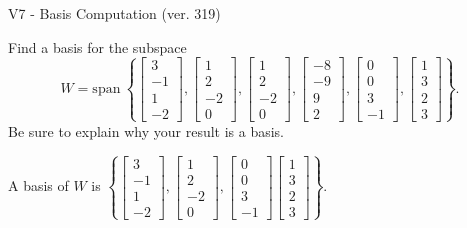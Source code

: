 \begin{exercise}
  \begin{exerciseTitle}V7 - Basis Computation (ver. 319)\end{exerciseTitle}
  \begin{exerciseStatement}
    Find a basis for the subspace 
\[W=\mathrm{span}\ \left\{\left[\begin{array}{r}
3 \\
-1 \\
1 \\
-2
\end{array}\right] , \left[\begin{array}{r}
1 \\
2 \\
-2 \\
0
\end{array}\right] , \left[\begin{array}{r}
1 \\
2 \\
-2 \\
0
\end{array}\right] , \left[\begin{array}{r}
-8 \\
-9 \\
9 \\
2
\end{array}\right] , \left[\begin{array}{r}
0 \\
0 \\
3 \\
-1
\end{array}\right] , \left[\begin{array}{r}
1 \\
3 \\
2 \\
3
\end{array}\right]\right\}.\]
 Be sure to explain why your result is a basis.


  \end{exerciseStatement}
  \begin{exerciseAnswer}
   A basis of \(W\) is  \(\left\{\left[\begin{array}{r}
3 \\
-1 \\
1 \\
-2
\end{array}\right] , \left[\begin{array}{r}
1 \\
2 \\
-2 \\
0
\end{array}\right] , \left[\begin{array}{r}
0 \\
0 \\
3 \\
-1
\end{array}\right] \left[\begin{array}{r}
1 \\
3 \\
2 \\
3
\end{array}\right]\right\}\).
  


  \end{exerciseAnswer}
\end{exercise}